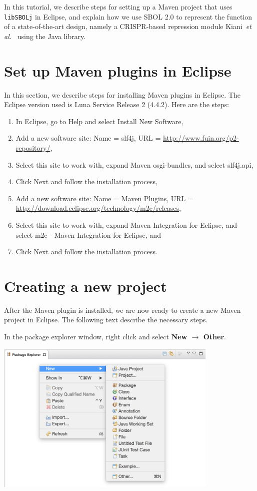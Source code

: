 \noindent In this tutorial, we describe steps for setting up a Maven
project that uses {\tt libSBOLj} in Eclipse, and explain how we use SBOL
2.0 to represent the function of a state-of-the-art design, namely a
CRISPR-based repression module Kiani~\textit{et
  al.}~\cite{kiani2014crispr} using the Java library. 

\section*{Set up Maven plugins in Eclipse}
In this section, we describe steps for installing Maven plugins in Eclipse. The Eclipse version used is Luna Service Release 2 (4.4.2). Here are the steps:
\begin{enumerate}
\item In Eclipse, go to Help and select Install New Software, 
\item Add a new software site: Name = slf4j, URL = \url{http://www.fuin.org/p2-repository/}, 
\item Select this site to work with, expand Maven osgi-bundles, and select slf4j.api, 
\item Click Next and follow the installation process, 
\item Add a new software site: Name = Maven Plugins, URL = \url{http://download.eclipse.org/technology/m2e/releases}, 
\item Select this site to work with, expand Maven Integration for Eclipse, and select m2e - Maven Integration for Eclipse, and
\item Click Next and follow the installation process.
\end{enumerate}

\section*{Creating a new project}
After the Maven plugin is installed, we are now ready to create a new Maven project in Eclipse. The following text describe the necessary steps. 

In the package explorer window, right click and select {\bf New $\rightarrow$ Other}.
\begin{center}
  \includegraphics[width=0.8\textwidth]{figures/createNewMavenProject1}
\end{center}

